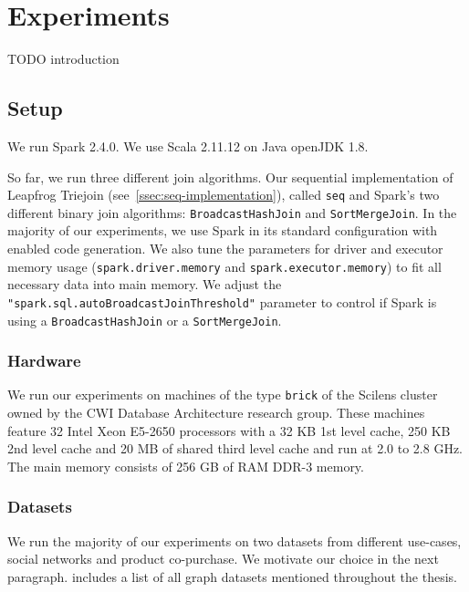 \section{Experiments}\label{sec:experiments}

TODO introduction

\subsection{Setup}


We run Spark 2.4.0.
We use Scala 2.11.12 on Java openJDK 1.8.

So far, we run three different join algorithms.
Our sequential implementation of Leapfrog Triejoin (see~\cref{ssec:seq-implementation}), called \texttt{seq} and Spark's two different binary join
algorithms: \texttt{BroadcastHashJoin} and \texttt{SortMergeJoin}.
In the majority of our experiments, we use Spark in its standard configuration with enabled code generation.
We also tune the parameters for driver and executor memory usage (\texttt{spark.driver.memory} and \texttt{spark.executor.memory}) to fit
all necessary data into main memory.
We adjust the \texttt{"spark.sql.autoBroadcastJoinThreshold"} parameter to control if Spark is using a \texttt{BroadcastHashJoin} or a \texttt{SortMergeJoin}.

\subsubsection{Hardware}

We run our experiments on machines of the type \texttt{brick} of the Scilens cluster owned by the CWI Database Architecture research group.
These machines feature 32 Intel Xeon E5-2650 processors with a 32 KB 1st level cache, 250 KB 2nd level cache and 20 MB of shared third level cache and run at 2.0 to 2.8 GHz.
The main memory consists of 256 GB of RAM DDR-3 memory.



\subsubsection{Datasets}
We run the majority of our experiments on two datasets from different use-cases, social networks and product co-purchase.
We motivate our choice in the next paragraph.
 includes a list of all graph datasets mentioned throughout the thesis.

